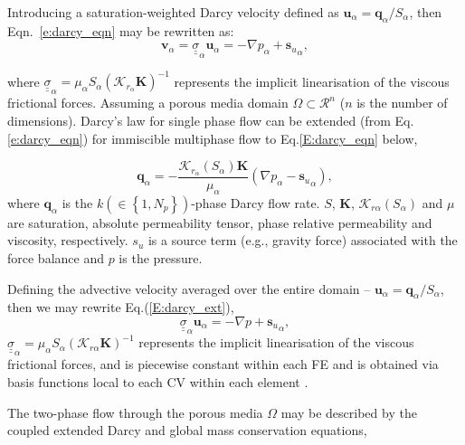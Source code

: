 \documentclass[preprint,authoryear,12pt]{elsarticle}
\begin{document}
Introducing a saturation-weighted Darcy velocity defined as $\mathbf{u}_\alpha= \mathbf{q}_\alpha/S_\alpha$, then Eqn.~\ref{e:darcy_eqn} may be rewritten as:
\begin{equation}
  \mathbf{v}_\alpha={\underline {\underline \sigma}}_{\alpha} \mathbf{u}_{\alpha} = - \nabla p_{\alpha} + {\mathbf{s}_{u}}_{\alpha},
  \label{force-bal}
\end{equation}

where ${\underline {\underline \sigma}}_{\alpha}=\mu_\alpha S_\alpha \left(\mathcal{K}_{{r}_\alpha}\mathbf{K}\right)^{-1}$ represents the implicit linearisation of the viscous frictional forces. Assuming a porous media domain $\Omega\subset\mathcal{R}^{n}$ ($n$ is the number of dimensions). Darcy's law for single phase flow can be extended (from Eq.\ref{e:darcy_eqn}) for immiscible multiphase flow to Eq.\ref{E:darcy_eqn} below,

\begin{equation}
  \mathbf{q}_{\alpha} = -\frac{\mathcal{K}_{{r}_\alpha}\left(S_{\alpha}\right)\mathbf{K}}{\mu_{\alpha}}\left( \nabla p_{\alpha} - {\mathbf{s}_{u}}_{\alpha} \right),
\label{E:darcy_eqn}
\end{equation}
where $\mathbf{q}_{\alpha}$ is the $k\left(\in\left\{1,N_{p}\right\}\right)$-phase Darcy flow rate. $S$, $\mathbf{K}$, $\mathcal{K}_{r\alpha}\left(S_{\alpha}\right)$ and $\mu$ are saturation, absolute permeability tensor, phase relative permeability and viscosity, respectively. $s_{u}$ is a source term (e.g., gravity force) associated with the force balance and $p$ is the pressure.

 Defining the advective velocity averaged over the entire domain -- $\mathbf{u}_{\alpha}= \mathbf{q}_{\alpha}/S_{\alpha}$, then we may rewrite Eq.(\ref{E:darcy_ext}),
\begin{equation}
  {\underline {\underline \sigma}}_{\alpha} \mathbf{u}_{\alpha} = - \nabla p + {\mathbf{s}_{u}}_{\alpha},
  \label{E:darcy_ext}
\end{equation}
$\underline{\underline{\sigma}}_{\alpha}=\mu_{\alpha}S_{\alpha}\left(\mathcal{K}_{r\alpha}\mathbf{K}\right)^{-1}$ represents the implicit linearisation of the viscous frictional forces, and is piecewise constant within each FE and is obtained via basis functions local to each CV within each element \citep{Jackson13,Radunz14}.

The two-phase flow through the porous media $\Omega$ may be described by the coupled extended Darcy and global mass conservation equations,
\end{document}
